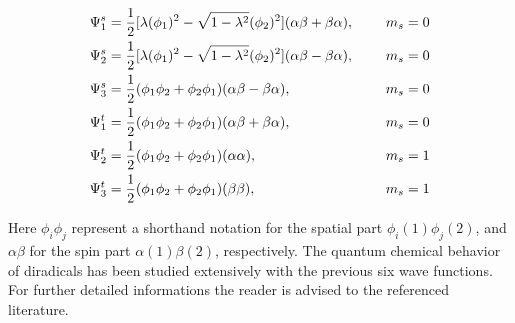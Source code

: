 \documentclass[aip,graphicx,amsmath,reprint]{revtex4-1}
\begin{document}
\\
\begin{small}
\begin{subequations}
\begin{align}
\Psi^{s}_1 &= \frac{1}{2}[\lambda(\phi_1)^2 - \sqrt{1-\lambda^2}(\phi_2)^2](\alpha\beta+\beta\alpha),\hspace{0.5cm}&m_s=0
\label{eq:slaters1}
\\
\Psi^{s}_2 &= \frac{1}{2}[\lambda(\phi_1)^2 - \sqrt{1-\lambda^2}(\phi_2)^2](\alpha\beta-\beta\alpha),\hspace{0.5cm}&m_s=0
\label{eq:slaters2}
\\
\Psi^{s}_3 &= \frac{1}{2}(\phi_1\phi_2+\phi_2\phi_1)(\alpha\beta-\beta\alpha),\hspace{0.5cm}&m_s=0
\label{eq:slaters3}
\\
\Psi^{t}_1 &= \frac{1}{2}(\phi_1\phi_2+\phi_2\phi_1)(\alpha\beta+\beta\alpha),\hspace{0.5cm}&m_s=0
\label{eq:slatert1}
\\
\Psi^{t}_2 &= \frac{1}{2}(\phi_1\phi_2+\phi_2\phi_1)(\alpha\alpha),\hspace{0.5cm}&m_s=1
\label{eq:slatert2}
\\
\Psi^{t}_3 &= \frac{1}{2}(\phi_1\phi_2+\phi_2\phi_1)(\beta\beta),\hspace{0.5cm}&m_s=1
\label{eq:slatert3}
\end{align}
\end{subequations}
\end{small}

Here $\phi_i\phi_j$ represent a shorthand notation for the spatial part $\phi_i(1)\phi_j(2)$, and $\alpha\beta$ for the spin part $\alpha(1)\beta(2)$, respectively. The quantum chemical behavior of diradicals has been studied extensively with the previous six wave functions. For further detailed informations the reader is advised to the referenced literature.\cite{Salem1972, Borden1982, Michl1987, Krylov2002}
\\
\end{document}

